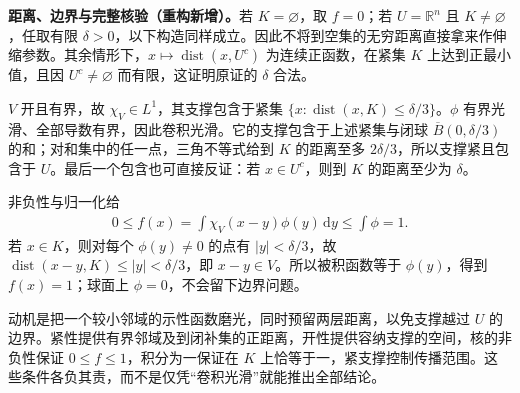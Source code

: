 \documentclass[../../main.tex]{subfiles}
\begin{document}
\begin{remark}
\textbf{距离、边界与完整核验（重构新增）。}若 $K=\varnothing$，取 $f=0$；若 $U=\mathbb R^n$ 且 $K\ne\varnothing$，任取有限 $\delta>0$，以下构造同样成立。因此不将到空集的无穷距离直接拿来作伸缩参数。其余情形下，$x\mapsto\operatorname{dist}(x,U^c)$ 为连续正函数，在紧集 $K$ 上达到正最小值，且因 $U^c\ne\varnothing$ 而有限，这证明原证的 $\delta$ 合法。

$V$ 开且有界，故 $\chi_V\in L^1$，其支撑包含于紧集 $\{x:\operatorname{dist}(x,K)\leqslant\delta/3\}$。$\phi$ 有界光滑、全部导数有界，因此卷积光滑。它的支撑包含于上述紧集与闭球 $\overline B(0,\delta/3)$ 的和；对和集中的任一点，三角不等式给到 $K$ 的距离至多 $2\delta/3$，所以支撑紧且包含于 $U$。最后一个包含也可直接反证：若 $x\in U^c$，则到 $K$ 的距离至少为 $\delta$。

非负性与归一化给
\begin{align*}
0\leqslant f(x)=\int\chi_V(x-y)\phi(y)\,\mathrm dy\leqslant\int\phi=1.
\end{align*}
若 $x\in K$，则对每个 $\phi(y)\ne0$ 的点有 $|y|<\delta/3$，故 $\operatorname{dist}(x-y,K)\leqslant|y|<\delta/3$，即 $x-y\in V$。所以被积函数等于 $\phi(y)$，得到 $f(x)=1$；球面上 $\phi=0$，不会留下边界问题。

动机是把一个较小邻域的示性函数磨光，同时预留两层距离，以免支撑越过 $U$ 的边界。紧性提供有界邻域及到闭补集的正距离，开性提供容纳支撑的空间，核的非负性保证 $0\leqslant f\leqslant1$，积分为一保证在 $K$ 上恰等于一，紧支撑控制传播范围。这些条件各负其责，而不是仅凭“卷积光滑”就能推出全部结论。
\end{remark}
\end{document}
